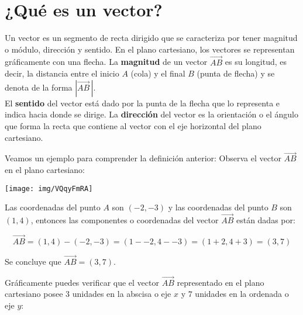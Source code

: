 \section{¿Qué es un vector?}

Un vector es un segmento de recta dirigido que se caracteriza por tener magnitud o módulo, dirección y sentido. En el plano cartesiano, los vectores se representan gráficamente con una flecha. La \textbf{magnitud} de un vector $\overrightarrow{AB}$ es su longitud, es decir, la distancia entre el inicio $A$ (cola) y el final $B$ (punta de flecha) y se denota de la forma $|\overrightarrow{AB}\,|$.\\

\noindent El \textbf{sentido} del vector está dado por la punta de la flecha que lo representa e indica hacia donde se dirige. La \textbf{dirección} del vector es la orientación o el ángulo que forma la recta que contiene al vector con el eje horizontal del plano cartesiano.


\noindent Veamos un ejemplo para comprender la definición anterior: Observa el vector $\overrightarrow{AB}$ en el plano cartesiano:

\begin{center}
	\texttt{[image: img/VQqyFmRA]}
\end{center}

\noindent Las coordenadas del punto $A$ son $(-2,-3)$ y las coordenadas del punto $B$ son $(1,4)$, entonces las componentes o coordenadas del vector $\overrightarrow{AB}$ están dadas por:

$$\overrightarrow{AB}=(1,4)-(-2,-3)=(1--2,4--3)=(1+2,4+3)=(3,7)$$
\vspace*{.05cm}

\noindent Se concluye que $\overrightarrow{AB}=(3,7)$. 

\newpage
\noindent Gráficamente puedes verificar que el vector $\overrightarrow{AB}$ representado en el plano cartesiano posee $3$ unidades en la abscisa o eje $x$ y $7$ unidades en la ordenada o eje $y$:

